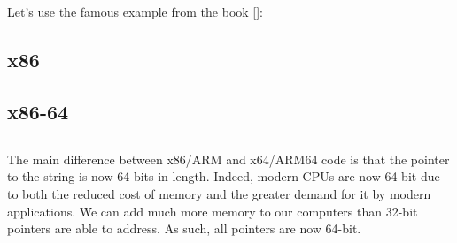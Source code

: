 \section{\HelloWorldSectionName}
\label{sec:helloworld}

Let's use the famous example from the book [\KRBook]:



\subsection{x86}





\subsection{x86-64}








\subsection{\Conclusion{}}

The main difference between x86/ARM and x64/ARM64 code is that the pointer to the string is now 64-bits in length.
Indeed, modern \ac{CPU}s are now 64-bit due to both the reduced cost of memory and the greater demand for it by modern applications.
We can add much more memory to our computers than 32-bit pointers are able to address.
As such, all pointers are now 64-bit.


